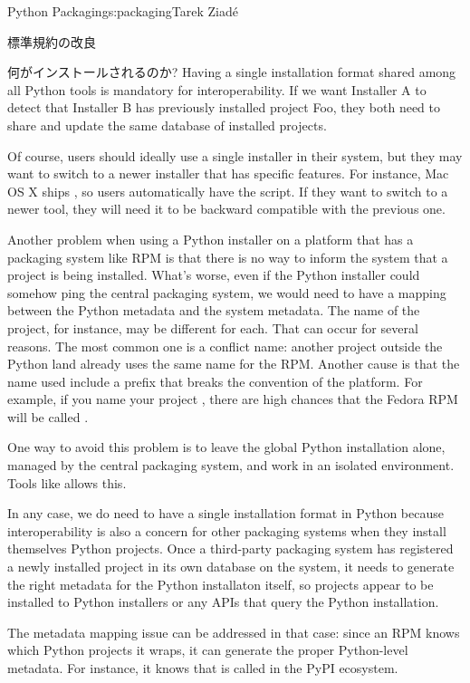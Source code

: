\begin{aosachapter}{Python Packaging}{s:packaging}{Tarek Ziad\'{e}}
\begin{aosasect1}{標準規約の改良}
\begin{aosasect2}{何がインストールされるのか?}
Having a single installation format shared among all Python tools is
mandatory for interoperability. If we want Installer A to detect that
Installer B has previously installed project Foo, they both need to
share and update the same database of installed projects.

Of course, users should ideally use a single installer in their
system, but they may want to switch to a newer installer that has
specific features. For instance, Mac OS X ships , so
users automatically have the  script. If they
want to switch to a newer tool, they will need it to be backward
compatible with the previous one.

Another problem when using a Python installer on a platform that has a
packaging system like RPM is that there is no way to inform the system
that a project is being installed. What's worse, even if the Python
installer could somehow ping the central packaging system, we would
need to have a mapping between the Python metadata and the system
metadata. The name of the project, for instance, may be different for
each. That can occur for several reasons. The most common one is 
a conflict name: another project outside the Python land already uses
the same name for the RPM. Another cause is that the name used include
a  prefix that breaks the convention of the platform.
For example, if you name your project , there are high
chances that the Fedora RPM will be called .

One way to avoid this problem is to leave the global Python
installation alone, managed by the central packaging system, and work
in an isolated environment.  Tools like  allows this.

In any case, we do need to have a single installation format in Python
because interoperability is also a concern for other packaging systems
when they install themselves Python projects.  Once a third-party 
packaging system has registered a newly installed project in its 
own database on the system, it needs to generate the right metadata 
for the Python installaton itself, so projects appear to be installed 
to Python installers or any APIs that query the Python installation.

The metadata mapping issue can be addressed in that case: since an RPM
knows which Python projects it wraps, it can generate the proper
Python-level metadata. For instance, it knows that
 is called  in the PyPI ecosystem.


\end{aosasect2}
\end{aosasect1}
\end{aosachapter}
